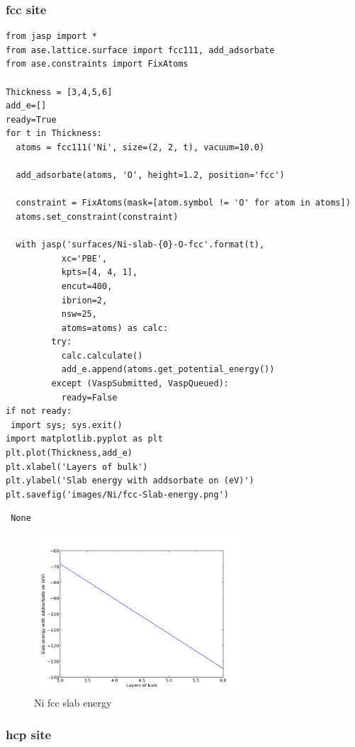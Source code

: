 \documentclass[11pt]{article}
\begin{document}
\subsubsection{fcc site}
\label{sec-3-4-1}


\begin{verbatim}
from jasp import *
from ase.lattice.surface import fcc111, add_adsorbate
from ase.constraints import FixAtoms

Thickness = [3,4,5,6]
add_e=[]
ready=True
for t in Thickness:
  atoms = fcc111('Ni', size=(2, 2, t), vacuum=10.0)

  add_adsorbate(atoms, 'O', height=1.2, position='fcc')

  constraint = FixAtoms(mask=[atom.symbol != 'O' for atom in atoms])
  atoms.set_constraint(constraint)

  with jasp('surfaces/Ni-slab-{0}-O-fcc'.format(t),
           xc='PBE',
           kpts=[4, 4, 1],
           encut=400,
           ibrion=2,
           nsw=25,
           atoms=atoms) as calc:
         try:
           calc.calculate()
           add_e.append(atoms.get_potential_energy())
         except (VaspSubmitted, VaspQueued):
           ready=False
if not ready:
 import sys; sys.exit()
import matplotlib.pyplot as plt
plt.plot(Thickness,add_e)
plt.xlabel('Layers of bulk')
plt.ylabel('Slab energy with addsorbate on (eV)')
plt.savefig('images/Ni/fcc-Slab-energy.png')
\end{verbatim}

\begin{verbatim}
 None
\end{verbatim}
\begin{figure}[H]
\centering
\includegraphics[width=0.7\textwidth]{./images/Ni/fcc-Slab-energy.png}
\caption{Ni fcc slab energy}
\end{figure}
\subsubsection{hcp site}
\label{sec-3-4-2}
\end{document}
